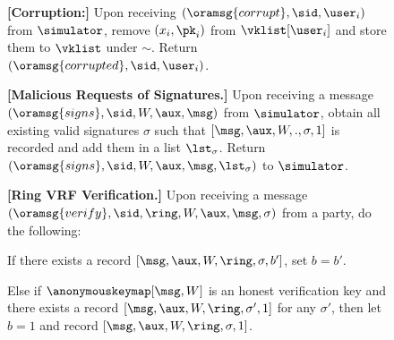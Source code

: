 \begin{figure}
\begin{tcolorbox}[left=2pt,right=2pt]
{			\textbf{[Corruption:] } 
			Upon receiving $ (\oramsg{corrupt}, \sid, \user_i) $ from $ \simulator $, remove $ (x_i,\pk_i) $ from $ \vklist[\user_i] $ and store them to $ \vklist $ under $ \sim $. Return $ (\oramsg{corrupted}, \sid,\user_i) $.
			
			\textbf{[Malicious Requests of  Signatures.]} Upon receiving a message $ (\oramsg{signs}, \sid, \allowbreak W, \aux,\msg) $ from $ \simulator $, obtain all existing valid signatures $ \sigma $ such that $ [\msg, \aux,W,.,\sigma, 1] $ is recorded and add them in a list $ \lst_{\sigma} $. 	Return $ (\oramsg{signs}, \sid, W,\aux,\msg, \lst_{\sigma})  $ to $ \simulator $.
			
			\textbf{[Ring VRF Verification.]} Upon receiving a message $(\oramsg{verify}, \sid, \ring,W, \aux, \msg, \sigma)$ from a party, do the following: 
				
				\begin{list}{\hspace*{1pt} C}{\setlength\leftmargin{0.15in}}
					\item If there exists a record $ [\msg,\aux,W,\ring,\sigma, b'] $, set $ b = b' $. 
					
					\label{cond:consistency}
					\item Else if $ \anonymouskeymap[\msg,W]  $ is an honest verification key and  there exists a record $ [\msg,\aux, W, \ring, \sigma', 1] $ for any $ \sigma' $, then let $ b=1 $ and record $ [\msg,\aux, W,\ring,\sigma, 1] $. 
					\label{cond:differentsignature}
					

\end{list}}
\end{tcolorbox}
\end{figure}
